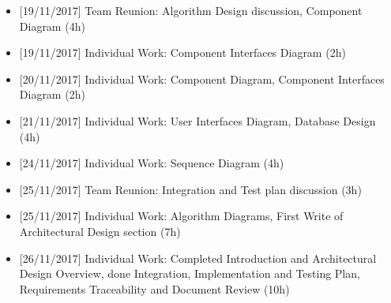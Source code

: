 \begin{itemize}
\begin{itemize}
            \item {[}19/11/2017{]} Team Reunion: Algorithm Design discussion, Component Diagram (4h)
            
            \item {[}19/11/2017{]} Individual Work: Component Interfaces Diagram (2h)
            
            \item {[}20/11/2017{]} Individual Work: Component Diagram, Component Interfaces Diagram (2h)
            
            \item {[}21/11/2017{]} Individual Work: User Interfaces Diagram, Database Design (4h)

            \item {[}24/11/2017{]} Individual Work: Sequence Diagram (4h)          

            \item {[}25/11/2017{]} Team Reunion: Integration and Test plan discussion (3h)
            
            \item {[}25/11/2017{]} Individual Work: Algorithm Diagrams, First Write of Architectural Design section (7h)
            
            \item {[}26/11/2017{]} Individual Work: Completed Introduction and Architectural Design Overview, done Integration, Implementation and Testing Plan, Requirements Traceability and Document Review (10h)
            
        \end{itemize}
        
\end{itemize}